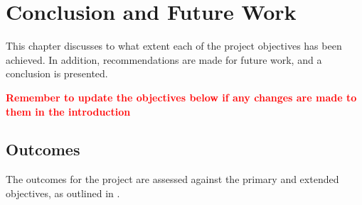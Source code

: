 \documentclass[main.tex]{subfiles}
\begin{document}
\chapter{Conclusion and Future Work}
This chapter discusses to what extent each of the project objectives has been achieved. In addition, recommendations are made for future work, and a conclusion is presented.  

\textcolor{red}{\textbf{Remember to update the objectives below if any changes are made to them in the introduction}}

\section{Outcomes}
The outcomes for the project are assessed against the primary and extended objectives, as outlined in .
\end{document}
